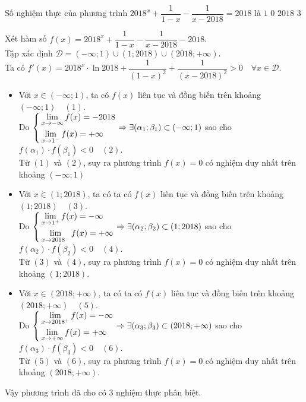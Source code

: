 \begin{ex}%
	Số nghiệm thực của phương trình $2018^x+\dfrac{1}{1-x}-\dfrac{1}{x-2018}=2018$ là
	\choice
	{$1$}
	{$0$}
	{$2018$}
	{\True $3$}
	\loigiai
	{ Xét hàm số $ f(x)=2018^x+\dfrac{1}{1-x}-\dfrac{1}{x-2018}-2018$.\\
		Tập xác định $\mathscr{D}= (-\infty ; 1) \cup (1;2018) \cup (2018;+ \infty).$\\
		Ta có $f'(x)=2018^x \cdot \ln 2018 + \dfrac{1}{(1-x)^2}+\dfrac{1}{(x-2018)^2} > 0 \quad \forall x \in \mathscr{D}$.
	\begin{itemize}
		\item  Với $x \in (-\infty ; 1)$, ta có $f(x)$ liên tục và đồng biến trên khoảng $(-\infty ; 1) \quad (1)$.\\
		Do $\left\{\begin{aligned}& \lim\limits_{x \rightarrow - \infty} f(x)= -2018\\& \lim\limits_{x \rightarrow 1^-} f(x)=+ \infty\end{aligned}\right. \Rightarrow  \exists (\alpha_1;\beta_1) \subset (-\infty ; 1)$ sao cho $f(\alpha_1)\cdot f(\beta_1)<0 \quad (2)$.\\
		Từ $(1)$ và $(2)$, suy ra phương trình $f(x)=0$ có nghiệm duy nhất trên khoảng $(-\infty ; 1)$
		\item Với $x \in (1;2018)$, ta có ta có $f(x)$ liên tục và đồng biến trên khoảng $(1 ; 2018) \quad (3)$.\\
		Do $\left\{\begin{aligned}& \lim\limits_{x \rightarrow 1^+} f(x)= -\infty\\& \lim\limits_{x \rightarrow 2018^-} f(x)=+ \infty\end{aligned}\right. \Rightarrow  \exists (\alpha_2;\beta_2) \subset (1 ; 2018)$ sao cho $f(\alpha_2)\cdot f(\beta_2)<0 \quad (4)$.\\
		Từ $(3)$ và $(4)$, suy ra phương trình $f(x)=0$ có nghiệm duy nhất trên khoảng $(1 ; 2018)$.
		\item Với $x \in (2018;+\infty)$, ta có ta có $f(x)$ liên tục và đồng biến trên khoảng $(2018;+\infty) \quad (5)$.\\
		Do $\left\{\begin{aligned}& \lim\limits_{x \rightarrow 2018^+} f(x)= -\infty\\& \lim\limits_{x \rightarrow + \infty } f(x)=+ \infty\end{aligned}\right. \Rightarrow  \exists (\alpha_3;\beta_3) \subset (2018;+\infty )$ sao cho $f(\alpha_3)\cdot f(\beta_3)<0 \quad (6)$.\\
		Từ $(5)$ và $(6)$, suy ra phương trình $f(x)=0$ có nghiệm duy nhất trên khoảng $(2018;+\infty)$.
	\end{itemize}
Vậy phương trình đã cho có $3$ nghiệm thực phân biệt.
	}
\end{ex}

